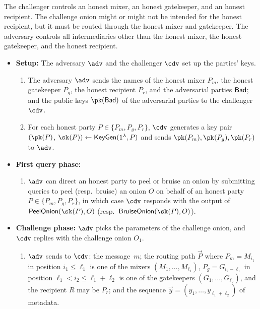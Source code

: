 \documentclass[runningheads,a4paper]{llncs}
\begin{document}
The challenger controls an honest mixer, an honest gatekeeper, and an honest recipient.  The challenge onion might or might not be intended for the honest recipient, but it must be routed through the honest mixer and gatekeeper. 
The adversary controls all intermediaries other than the honest mixer, the honest gatekeeper, and the honest recipient. %

\begin{itemize}
\item \textbf{Setup:} The adversary $\adv$ and the challenger $\cdv$ set up the parties' keys. 
\begin{enumerate}
    \item The adversary $\adv$ sends the names of 
    the honest mixer $P_m$, 
    the honest gatekeeper $P_g$, 
    the honest recipient $P_r$, and 
    the adversarial parties $\mathsf{Bad}$; and 
    the public keys $\pk(\Bad)$ of the adversarial parties to the challenger~$\cdv$. 

    \item For each honest party $P\in \{P_m, P_g, P_r\}$, $\cdv$ generates a key pair $(\pk(P)$, $\sk(P)) \gets \keygen(\secparam, P)$ and sends $\pk(P_m), \pk(P_g), \pk(P_r)$ to $\adv$.
\end{enumerate}

\item \textbf{First query phase:} 
\begin{enumerate} [resume]
    \item $\adv$ can direct an honest party to peel or bruise an onion by submitting queries to peel (resp.~bruise) an onion $O$ on behalf of an honest party $P \in \{P_m,P_g,P_r\}$, in which case $\cdv$ responds with the output of $\proconion(\sk(P), O)$ (resp.~$\bruiseonion(\sk(P), O)$).
\end{enumerate}

\item \textbf{Challenge phase:} $\adv$ picks the parameters of the challenge onion, and $\cdv$ replies with the challenge onion $O_1$. 
\begin{enumerate}[resume]
    \item $\adv$ sends to $\cdv$: 
    the message~$m$;
    the routing path $\vec{P}$ where $P_m = M_{i_1}$ in position $i_1 \leq \ell_1$ is one of the mixers $(M_1, \dots, M_{\ell_1})$, $P_g = G_{i_2-\ell_1}$ in position $\ell_1 < i_2 \leq \ell_1+\ell_2$ is one of the gatekeepers $(G_{1}, \dots, G_{\ell_2})$, and the recipient $R$ may be $P_r$; and 
    the sequence $\vec{y} = (y_1, \dots, y_{\ell_1+\ell_2})$ of metadata. 


\end{enumerate}
\end{itemize}
\end{document}
